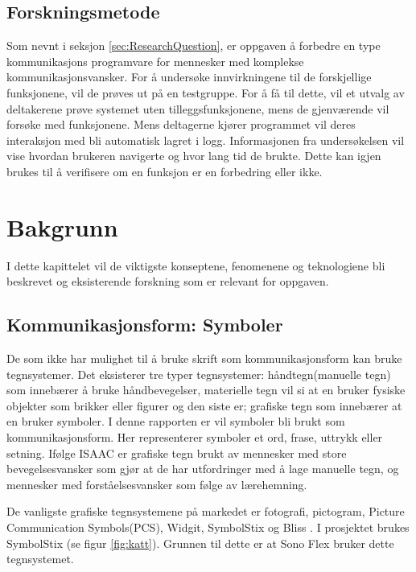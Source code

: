 \documentclass[phd,tocprelim]{cornell}
\begin{document}
\section{Forskningsmetode}

Som nevnt i seksjon \ref{sec:ResearchQuestion}, er oppgaven å forbedre en type kommunikasjons programvare for mennesker med komplekse kommunikasjonsvansker. For å undersøke innvirkningene til de forskjellige funksjonene, vil de prøves ut på en testgruppe.
For å få til dette, vil et utvalg av deltakerene prøve systemet uten tilleggsfunksjonene, mens de gjenværende vil forsøke med funksjonene. Mens deltagerne kjører programmet vil deres interaksjon med bli automatisk lagret i logg. Informasjonen fra undersøkelsen vil vise hvordan brukeren navigerte og hvor lang tid de brukte. Dette kan igjen brukes til å verifisere om en funksjon er en forbedring eller ikke.


\chapter{Bakgrunn}

I dette kapittelet vil de viktigste konseptene, fenomenene og teknologiene bli beskrevet og eksisterende  forskning som er relevant for oppgaven. 

\section{Kommunikasjonsform: Symboler}

De som ikke har mulighet til å bruke skrift som kommunikasjonsform kan bruke tegnsystemer. Det eksisterer tre typer tegnsystemer: håndtegn(manuelle tegn) som innebærer å bruke håndbevegelser, materielle tegn vil si at en bruker fysiske objekter som brikker eller figurer og den siste er; grafiske tegn som innebærer at en bruker symboler. I denne rapporten er vil symboler bli brukt som kommunikasjonsform. Her representerer symboler et ord, frase, uttrykk eller setning. Ifølge ISAAC \cite{Tegnsystemer} er grafiske tegn brukt av mennesker med store bevegelsesvansker som gjør at de har utfordringer med å lage manuelle tegn, og mennesker med forståelsesvansker som følge av lærehemning.

De vanligste grafiske tegnsystemene på markedet er fotografi, pictogram, Picture Communication Symbols(PCS), Widgit, SymbolStix og Bliss \cite{GrafiskTegn}. I prosjektet brukes SymbolStix (se figur \ref{fig:katt}). Grunnen til dette er at Sono Flex bruker dette tegnsystemet.
\end{document}

